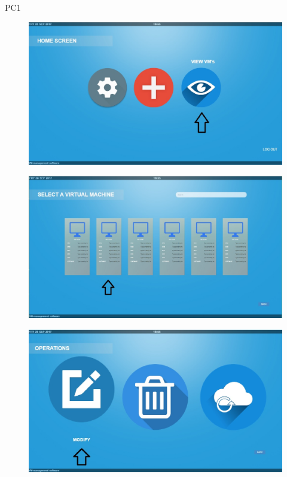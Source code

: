 \begin{lyxlist}{PC1}
\begin{figure}[H]
\centering
\includegraphics[width=170mm]{images/createVMMod1.eps}
\caption{\label{overflow}}
\end{figure}


\begin{figure}[H]
\centering
\includegraphics[width=170mm]{images/createVMMod2.eps}
\caption{\label{overflow}}
\end{figure}

\begin{figure}[H]
\centering
\includegraphics[width=170mm]{images/createVMMod3.eps}
\caption{\label{overflow}}
\end{figure}


\end{lyxlist}
